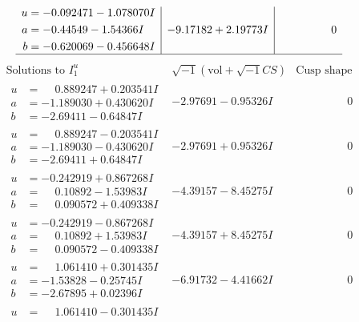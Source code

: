 \documentclass[1p]{elsarticle_modified}
\theoremstyle{definition}
\newcommand{\I}{\sqrt{-1}}
\begin{document}
$$\begin{array}{c|c|c}
\begin{aligned}
u &= -0.092471 - 1.078070 I \\
a &= -0.44549 - 1.54366 I \\
b &= -0.620069 - 0.456648 I\end{aligned}
 & -9.17182 + 2.19773 I & \phantom{-0.000000 } 0\\
 \hline 
 \end{array}$$\newpage$$\begin{array}{c|c|c}  
\text{Solutions to }I^u_{1}& \I (\text{vol} + \sqrt{-1}CS) & \text{Cusp shape}\\
 \hline 
\begin{aligned}
u &= \phantom{-}0.889247 + 0.203541 I \\
a &= -1.189030 + 0.430620 I \\
b &= -2.69411 - 0.64847 I\end{aligned}
 & -2.97691 - 0.95326 I & \phantom{-0.000000 } 0 \\ \hline\begin{aligned}
u &= \phantom{-}0.889247 - 0.203541 I \\
a &= -1.189030 - 0.430620 I \\
b &= -2.69411 + 0.64847 I\end{aligned}
 & -2.97691 + 0.95326 I & \phantom{-0.000000 } 0 \\ \hline\begin{aligned}
u &= -0.242919 + 0.867268 I \\
a &= \phantom{-}0.10892 - 1.53983 I \\
b &= \phantom{-}0.090572 + 0.409338 I\end{aligned}
 & -4.39157 - 8.45275 I & \phantom{-0.000000 } 0 \\ \hline\begin{aligned}
u &= -0.242919 - 0.867268 I \\
a &= \phantom{-}0.10892 + 1.53983 I \\
b &= \phantom{-}0.090572 - 0.409338 I\end{aligned}
 & -4.39157 + 8.45275 I & \phantom{-0.000000 } 0 \\ \hline\begin{aligned}
u &= \phantom{-}1.061410 + 0.301435 I \\
a &= -1.53828 - 0.25745 I \\
b &= -2.67895 + 0.02396 I\end{aligned}
 & -6.91732 - 4.41662 I & \phantom{-0.000000 } 0 \\ \hline\begin{aligned}
u &= \phantom{-}1.061410 - 0.301435 I \\

\end{aligned}
\end{array}$$
\end{document}
